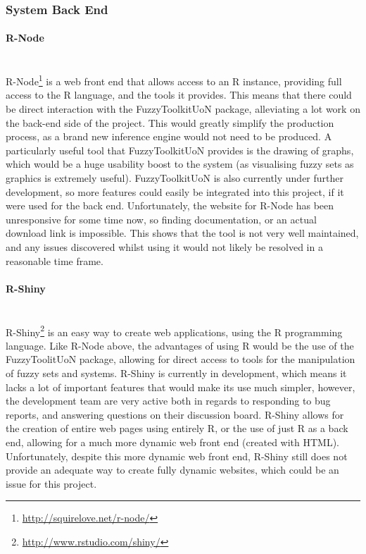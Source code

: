 \subsubsection{System Back End}
\vspace{-1mm}
\paragraph{R-Node}\ \\
R-Node\footnote{\url{http://squirelove.net/r-node/}} is a web front end that allows access to an R instance, providing full access to the R language, and the tools it provides. This means that there could be direct interaction with the FuzzyToolkitUoN package, alleviating a lot work on the back-end side of the project. This would greatly simplify the production process, as a brand new inference engine would not need to be produced. A particularly useful tool that FuzzyToolkitUoN provides is the drawing of graphs, which would be a huge usability boost to the system (as visualising fuzzy sets as graphics is extremely useful). FuzzyToolkitUoN is also currently under further development, so more features could easily be integrated into this project, if it were used for the back end. Unfortunately, the website for R-Node has been unresponsive for some time now, so finding documentation, or an actual download link is impossible. This shows that the tool is not very well maintained, and any issues discovered whilst using it would not likely be resolved in a reasonable time frame.

\paragraph{R-Shiny}\ \\
R-Shiny\footnote{\url{http://www.rstudio.com/shiny/}} is an easy way to create web applications, using the R programming language. Like R-Node above, the advantages of using R would be the use of the FuzzyToolitUoN package, allowing for direct access to tools for the manipulation of fuzzy sets and systems. R-Shiny is currently in development, which means it lacks a lot of important features that would make its use much simpler, however, the development team are very active both in regards to responding to bug reports, and answering questions on their discussion board. R-Shiny allows for the creation of entire web pages using entirely R, or the use of just R as a back end, allowing for a much more dynamic web front end (created with HTML). Unfortunately, despite this more dynamic web front end, R-Shiny still does not provide an adequate way to create fully dynamic websites, which could be an issue for this project.


